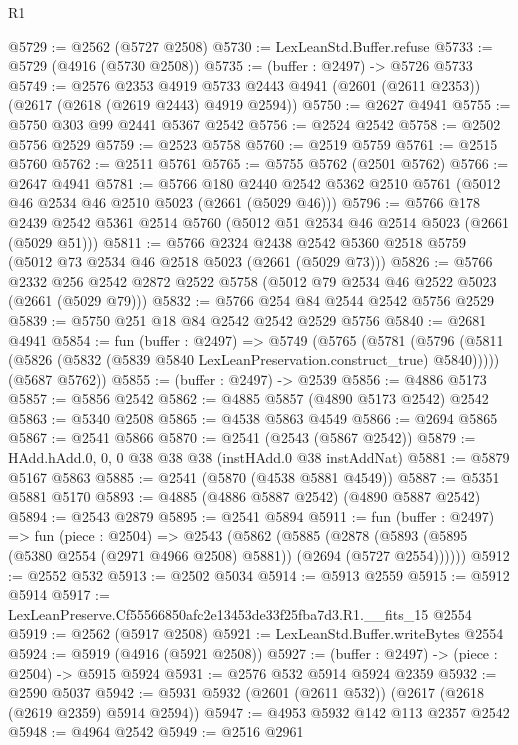 \begin{lexlean}{R1}
\begin{coremodule}
@5729 := @2562 (@5727 @2508)
@5730 := LexLeanStd.Buffer.refuse
@5733 := @5729 (@4916 (@5730 @2508))
@5735 := (buffer : @2497) -> @5726 @5733
@5749 := @2576
    @2353
    @4919
    @5733
    @2443
    @4941
    (@2601 (@2611 @2353))
    (@2617 (@2618 (@2619 @2443) @4919 @2594))
@5750 := @2627 @4941
@5755 := @5750 @303 @99 @2441 @5367 @2542
@5756 := @2524 @2542
@5758 := @2502 @5756 @2529
@5759 := @2523 @5758
@5760 := @2519 @5759
@5761 := @2515 @5760
@5762 := @2511 @5761
@5765 := @5755 @5762 (@2501 @5762)
@5766 := @2647 @4941
@5781 := @5766
    @180
    @2440
    @2542
    @5362
    @2510
    @5761
    (@5012 @46 @2534 @46 @2510 @5023 (@2661 (@5029 @46)))
@5796 := @5766
    @178
    @2439
    @2542
    @5361
    @2514
    @5760
    (@5012 @51 @2534 @46 @2514 @5023 (@2661 (@5029 @51)))
@5811 := @5766
    @2324
    @2438
    @2542
    @5360
    @2518
    @5759
    (@5012 @73 @2534 @46 @2518 @5023 (@2661 (@5029 @73)))
@5826 := @5766
    @2332
    @256
    @2542
    @2872
    @2522
    @5758
    (@5012 @79 @2534 @46 @2522 @5023 (@2661 (@5029 @79)))
@5832 := @5766 @254 @84 @2544 @2542 @5756 @2529
@5839 := @5750 @251 @18 @84 @2542 @2542 @2529 @5756
@5840 := @2681 @4941
@5854 := fun (buffer : @2497) =>
  @5749
    (@5765
      (@5781 (@5796 (@5811 (@5826 (@5832 (@5839 @5840 LexLeanPreservation.construct_true) @5840)))))
      (@5687 @5762))
@5855 := (buffer : @2497) -> @2539
@5856 := @4886 @5173
@5857 := @5856 @2542
@5862 := @4885 @5857 (@4890 @5173 @2542) @2542
@5863 := @5340 @2508
@5865 := @4538 @5863 @4549
@5866 := @2694 @5865
@5867 := @2541 @5866
@5870 := @2541 (@2543 (@5867 @2542))
@5879 := HAdd.hAdd.{0, 0, 0} @38 @38 @38 (instHAdd.{0} @38 instAddNat)
@5881 := @5879 @5167 @5863
@5885 := @2541 (@5870 (@4538 @5881 @4549))
@5887 := @5351 @5881 @5170
@5893 := @4885 (@4886 @5887 @2542) (@4890 @5887 @2542)
@5894 := @2543 @2879
@5895 := @2541 @5894
@5911 := fun (buffer : @2497) =>
  fun (piece : @2504) =>
  @2543
    (@5862
      (@5885 (@2878 (@5893 (@5895 (@5380 @2554 (@2971 @4966 @2508) @5881)) (@2694 (@5727 @2554))))))
@5912 := @2552 @532
@5913 := @2502 @5034
@5914 := @5913 @2559
@5915 := @5912 @5914
@5917 := LexLeanPreserve.Cf55566850afc2e13453de33f25fba7d3.R1.__fits_15 @2554
@5919 := @2562 (@5917 @2508)
@5921 := LexLeanStd.Buffer.writeBytes @2554
@5924 := @5919 (@4916 (@5921 @2508))
@5927 := (buffer : @2497) -> (piece : @2504) -> @5915 @5924
@5931 := @2576 @532 @5914 @5924 @2359
@5932 := @2590 @5037
@5942 := @5931 @5932 (@2601 (@2611 @532)) (@2617 (@2618 (@2619 @2359) @5914 @2594))
@5947 := @4953 @5932 @142 @113 @2357 @2542
@5948 := @4964 @2542
@5949 := @2516 @2961

\end{coremodule}
\end{lexlean}
